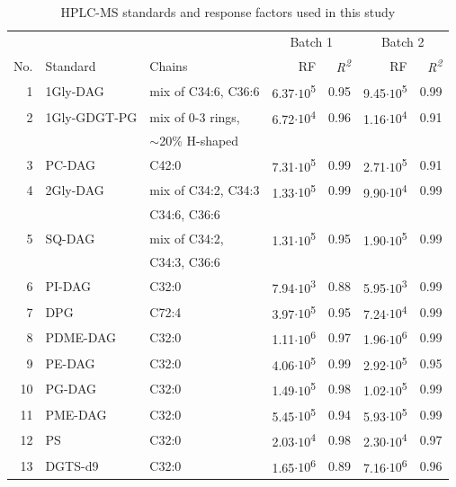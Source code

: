 \begin{table}
\centering
\begin{threeparttable}
  \caption{HPLC-MS standards and response factors used in this study}
 
\begin{tabular}{rllrrrr}
\toprule
      &       &       & \multicolumn{2}{c}{Batch 1\tnote{b}} & \multicolumn{2}{c}{Batch 2\tnote{c}} \\
\cmidrule(l{2pt}r{2pt}){4-5} \cmidrule(l{2pt}r{2pt}){6-7}No.\tnote{a} & Standard & Chains & RF    & \textit{R\textsuperscript{2}} & RF    & \textit{R\textsuperscript{2}} \\
\midrule
1     & 1Gly-DAG & mix of C34:6, C36:6 & 6.37$\cdot 10$\textsuperscript{5} & 0.95  & 9.45$\cdot 10$\textsuperscript{5} & 0.99 \\
2     & 1Gly-GDGT-PG & mix of 0-3 rings, & 6.72$\cdot 10$\textsuperscript{4} & 0.96  & 1.16$\cdot 10$\textsuperscript{4} & 0.91 \\
      &       & $\sim$20\% H-shaped &       &       &       &  \\
3     & PC-DAG & C42:0 & 7.31$\cdot 10$\textsuperscript{5} & 0.99  & 2.71$\cdot 10$\textsuperscript{5} & 0.91 \\
4     & 2Gly-DAG & mix of C34:2, C34:3 & 1.33$\cdot 10$\textsuperscript{5} & 0.99  & 9.90$\cdot 10$\textsuperscript{4} & 0.99 \\
      &       & C34:6, C36:6 &       &       &       &  \\
5     & SQ-DAG & mix of C34:2,  & 1.31$\cdot 10$\textsuperscript{5} & 0.95  & 1.90$\cdot 10$\textsuperscript{5} & 0.99 \\
      &       & C34:3, C36:6 &       &       &       &  \\
6     & PI-DAG & C32:0 & 7.94$\cdot 10$\textsuperscript{3} & 0.88  & 5.95$\cdot 10$\textsuperscript{3} & 0.99 \\
7     & DPG   & C72:4 & 3.97$\cdot 10$\textsuperscript{5} & 0.95  & 7.24$\cdot 10$\textsuperscript{4} & 0.99 \\
8     & PDME-DAG & C32:0 & 1.11$\cdot 10$\textsuperscript{6} & 0.97  & 1.96$\cdot 10$\textsuperscript{6} & 0.99 \\
9     & PE-DAG & C32:0 & 4.06$\cdot 10$\textsuperscript{5} & 0.99  & 2.92$\cdot 10$\textsuperscript{5} & 0.95 \\
10    & PG-DAG & C32:0 & 1.49$\cdot 10$\textsuperscript{5} & 0.98  & 1.02$\cdot 10$\textsuperscript{5} & 0.99 \\
11    & PME-DAG & C32:0 & 5.45$\cdot 10$\textsuperscript{5} & 0.94  & 5.93$\cdot 10$\textsuperscript{5} & 0.99 \\
12    & PS    & C32:0 & 2.03$\cdot 10$\textsuperscript{4} & 0.98  & 2.30$\cdot 10$\textsuperscript{4} & 0.97 \\
13    & DGTS-d9 & C32:0 & 1.65$\cdot 10$\textsuperscript{6} & 0.89  & 7.16$\cdot 10$\textsuperscript{6} & 0.96 \\
\bottomrule
\end{tabular}%




\end{threeparttable}
\end{table}
